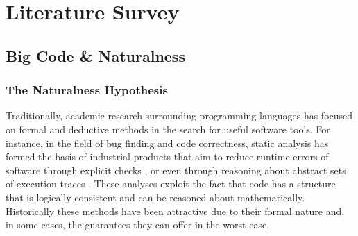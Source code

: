 \chapter{Literature Survey}
\label{literature_survey}


\section{Big Code \& Naturalness} %

\subsection{The Naturalness Hypothesis} %
\label{ssub:the_naturalness_hypothesis}

Traditionally, academic research surrounding programming languages has focused on formal and deductive methods in the search for useful software tools.
For instance, in the field of bug finding and code correctness, static analysis has formed the basis of industrial products that aim to reduce runtime errors of software through explicit checks \cite{okada_combination_2007}, or even through reasoning about abstract sets of execution traces
\cite{bessey_few_2010}.
These analyses exploit the fact that code has a structure that is logically consistent and can be reasoned about mathematically.
Historically these methods have been attractive due to their formal nature and, in some cases, the guarantees they can offer in the worst case.


